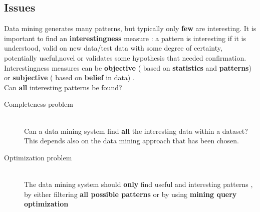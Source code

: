\subsection{Issues}
Data mining generates many patterns, but typically only \textbf{few} are interesting. It is important to find an \textbf{interestingness} measure : a pattern is interesting if it is understood, valid on new data/test data with some degree of certainty, potentially useful,novel or validates some hypothesis that needed confirmation.\\
Interestingness measures can be \textbf{objective} ( based on \textbf{statistics} and \textbf{patterns}) or \textbf{subjective} ( based on \textbf{belief} in data) .\\
Can \textbf{all} interesting patterns be found?\\
\begin{description}
\item[Completeness problem]\hfill\\
Can a data mining system find \textbf{all} the interesting data within a dataset?
This depends also on the data mining approach that has been chosen.
\item[Optimization problem]\hfill\\
The data mining system should \textbf{only} find useful and interesting patterns , by either filtering \textbf{all possible patterns} or by using \textbf{mining query optimization}
\end{description}
